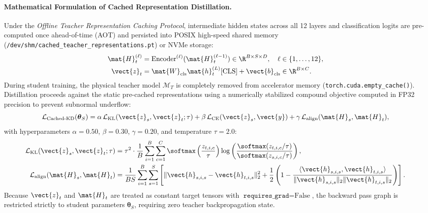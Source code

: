 \paragraph{Mathematical Formulation of Cached Representation Distillation.}
Under the \neuralops{} \emph{Offline Teacher Representation Caching Protocol}, intermediate hidden states across all 12 layers and classification logits are pre-computed once ahead-of-time (AOT) and persisted into POSIX high-speed shared memory (\texttt{/dev/shm/cached\_teacher\_representations.pt}) or NVMe storage:
\begin{align}
    \mat{H}_t^{(\ell)} &= \text{Encoder}^{(\ell)}(\mat{H}_t^{(\ell-1)}) \in \R^{B \times S \times D}, \quad \ell \in \{1, \dots, 12\}, \\
    \vect{z}_t &= \mat{W}_{\text{cls}} \mat{h}_t^{(L)}[\text{CLS}] + \vect{b}_{\text{cls}} \in \R^{B \times C}.
\end{align}
During student training, the physical teacher model $\mathcal{M}_T$ is completely removed from accelerator memory (\texttt{torch.cuda.empty\_cache()}). Distillation proceeds against the static pre-cached representations using a numerically stabilized compound objective computed in FP32 precision to prevent subnormal underflow:
\begin{equation}
    \mathcal{L}_{\text{Cached-KD}}(\boldsymbol{\theta}_S) = \alpha \, \mathcal{L}_{\text{KL}}(\vect{z}_s, \vect{z}_t; \tau) + \beta \, \mathcal{L}_{\text{CE}}(\vect{z}_s, \vect{y}) + \gamma \, \mathcal{L}_{\text{align}}(\mat{H}_s, \mat{H}_t),
    \label{eq:arxiv_cached_kd_loss}
\end{equation}
with hyperparameters $\alpha = 0.50$, $\beta = 0.30$, $\gamma = 0.20$, and temperature $\tau = 2.0$:
\begin{align}
    \mathcal{L}_{\text{KL}}(\vect{z}_s, \vect{z}_t; \tau) &= \tau^2 \cdot \frac{1}{B} \sum_{i=1}^B \sum_{c=1}^C \softmax\left(\frac{z_{t, i, c}}{\tau}\right) \log\left(\frac{\softmax(z_{t, i, c} / \tau)}{\softmax(z_{s, i, c} / \tau)}\right), \label{eq:arxiv_kl_formula} \\
    \mathcal{L}_{\text{align}}(\mat{H}_s, \mat{H}_t) &= \frac{1}{B S} \sum_{i=1}^B \sum_{s=1}^S \left[ \|\vect{h}_{s, i, s} - \vect{h}_{t, i, s}\|_2^2 + \frac{1}{2} \left(1 - \frac{\langle \vect{h}_{s, i, s}, \vect{h}_{t, i, s} \rangle}{\|\vect{h}_{s, i, s}\|_2 \|\vect{h}_{t, i, s}\|_2}\right) \right]. \label{eq:arxiv_align_formula}
\end{align}
Because $\vect{z}_t$ and $\mat{H}_t$ are treated as constant target tensors with $\texttt{requires\_grad}=\text{False}$, the backward pass graph is restricted strictly to student parameters $\boldsymbol{\theta}_S$, requiring zero teacher backpropagation state.

